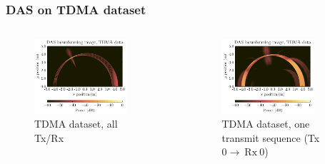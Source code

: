 \documentclass[UKenglish,8pt,aspectratio=1610]{beamer}
\begin{document}
\begin{frame}
	\frametitle{DAS on TDMA dataset}

\begin{columns}
	\begin{column}{0.5\textwidth}
		\begin{figure}[h!]
			\includegraphics[width=0.8\textwidth]{question3/TDMA_DAS_image.pdf}
			\centering
			\caption{TDMA dataset, all Tx/Rx}
		\end{figure}
	\end{column}
	\begin{column}{0.5\textwidth}
		\begin{figure}[h!]
			\includegraphics[width=0.8\textwidth]{question3/TDMA_DAS_image_one_transmit_0_0.pdf}
			\centering
			\caption{TDMA dataset, one transmit sequence (Tx $0\rightarrow~\text{Rx}~0$)}
		\end{figure}
	\end{column}
\end{columns}

\end{frame}
\end{document}
